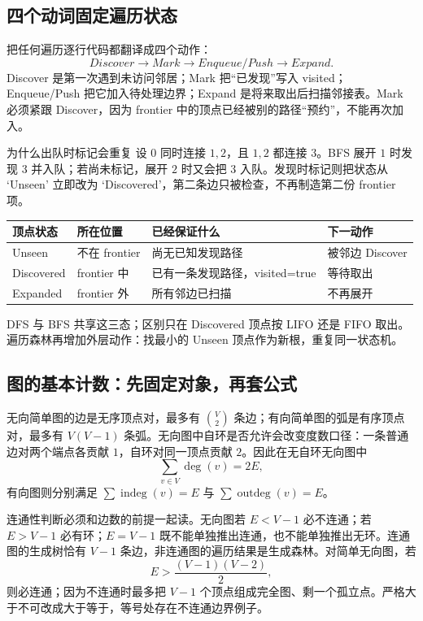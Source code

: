 \documentclass[UTF8,fontset=none,11pt,a4paper]{ctexart}
\begin{document}
\subsection{四个动词固定遍历状态}
把任何遍历逐行代码都翻译成四个动作：
\[
\boxed{Discover\to Mark\to Enqueue/Push\to Expand}.
\]
Discover 是第一次遇到未访问邻居；Mark 把“已发现”写入 visited；Enqueue/Push 把它加入待处理边界；Expand 是将来取出后扫描邻接表。Mark 必须紧跟 Discover，因为 frontier 中的顶点已经被别的路径“预约”，不能再次加入。

\begin{examplebox}{为什么出队时标记会重复}
设 $0$ 同时连接 $1,2$，且 $1,2$ 都连接 $3$。BFS 展开 $1$ 时发现 $3$ 并入队；若尚未标记，展开 $2$ 时又会把 $3$ 入队。发现时标记则把状态从 `Unseen' 立即改为 `Discovered'，第二条边只被检查，不再制造第二份 frontier 项。
\end{examplebox}

\begin{center}\small
\begin{tabularx}{\linewidth}{L{2.1cm}L{2.4cm}YY}
\toprule
顶点状态 & 所在位置 & 已经保证什么 & 下一动作\\
\midrule
Unseen & 不在 frontier & 尚无已知发现路径 & 被邻边 Discover\\
Discovered & frontier 中 & 已有一条发现路径，visited=true & 等待取出\\
Expanded & frontier 外 & 所有邻边已扫描 & 不再展开\\
\bottomrule
\end{tabularx}
\end{center}

DFS 与 BFS 共享这三态；区别只在 Discovered 顶点按 LIFO 还是 FIFO 取出。遍历森林再增加外层动作：找最小的 Unseen 顶点作为新根，重复同一状态机。

\subsection{图的基本计数：先固定对象，再套公式}
无向简单图的边是无序顶点对，最多有 $\binom{V}{2}$ 条边；有向简单图的弧是有序顶点对，最多有 $V(V-1)$ 条弧。无向图中自环是否允许会改变度数口径：一条普通边对两个端点各贡献 $1$，自环对同一顶点贡献 $2$。因此在无自环无向图中
\[
\sum_{v\in V}\deg(v)=2E,
\]
有向图则分别满足 $\sum \operatorname{indeg}(v)=E$ 与 $\sum \operatorname{outdeg}(v)=E$。

连通性判断必须和边数的前提一起读。无向图若 $E<V-1$ 必不连通；若 $E>V-1$ 必有环；$E=V-1$ 既不能单独推出连通，也不能单独推出无环。连通图的生成树恰有 $V-1$ 条边，非连通图的遍历结果是生成森林。对简单无向图，若
\[
E>\frac{(V-1)(V-2)}2,
\]
则必连通；因为不连通时最多把 $V-1$ 个顶点组成完全图、剩一个孤立点。严格大于不可改成大于等于，等号处存在不连通边界例子。
\end{document}
